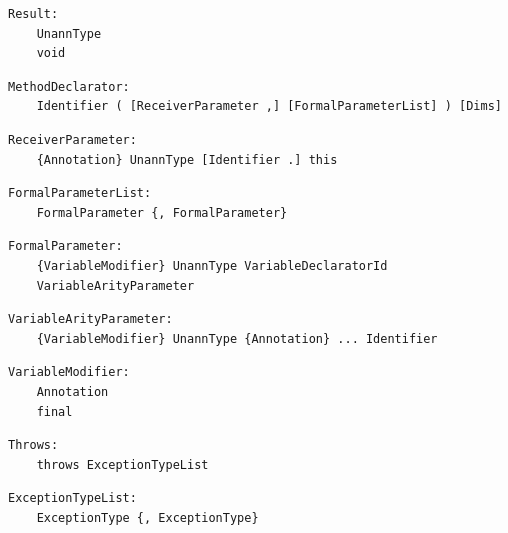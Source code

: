 \noindent\textbf{\texttt{}}\par
\begin{lstlisting}
Result:
    UnannType
    void
\end{lstlisting}

\noindent\textbf{\texttt{}}\par
\begin{lstlisting}
MethodDeclarator:
    Identifier ( [ReceiverParameter ,] [FormalParameterList] ) [Dims]
\end{lstlisting}

\noindent\textbf{\texttt{}}\par
\begin{lstlisting}
ReceiverParameter:
    {Annotation} UnannType [Identifier .] this
\end{lstlisting}

\noindent\textbf{\texttt{}}\par
\begin{lstlisting}
FormalParameterList:
    FormalParameter {, FormalParameter}
\end{lstlisting}

\noindent\textbf{\texttt{}}\par
\begin{lstlisting}
FormalParameter:
    {VariableModifier} UnannType VariableDeclaratorId
    VariableArityParameter
\end{lstlisting}

\noindent\textbf{\texttt{}}\par
\begin{lstlisting}
VariableArityParameter:
    {VariableModifier} UnannType {Annotation} ... Identifier
\end{lstlisting}

\noindent\textbf{\texttt{}}\par
\begin{lstlisting}
VariableModifier:
    Annotation
    final
\end{lstlisting}

\noindent\textbf{\texttt{}}\par
\begin{lstlisting}
Throws:
    throws ExceptionTypeList
\end{lstlisting}

\noindent\textbf{\texttt{}}\par
\begin{lstlisting}
ExceptionTypeList:
    ExceptionType {, ExceptionType}
\end{lstlisting}

